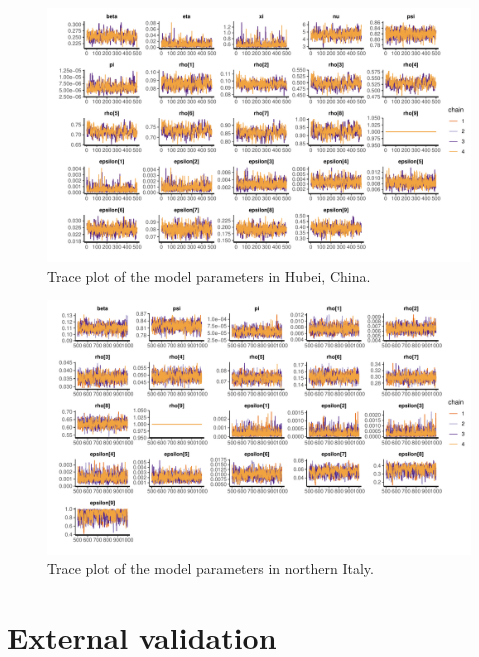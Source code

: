 \documentclass{article}
\begin{document}
	\begin{figure}[H]
	\centering
	\includegraphics[width=\linewidth]{../format_output/figures/traceplot_china.pdf}
	\caption{Trace plot of the model parameters in Hubei, China.}
	\label{fig:trace1}
	\end{figure}
		
	\begin{figure}[H]
		\centering
		\includegraphics[width=\linewidth]{../format_output/figures/traceplot_italy.pdf}
		\caption{Trace plot of the model parameters in northern Italy.}
		\label{fig:trace2}
	\end{figure}

\clearpage
\section{External validation}
\end{document}
